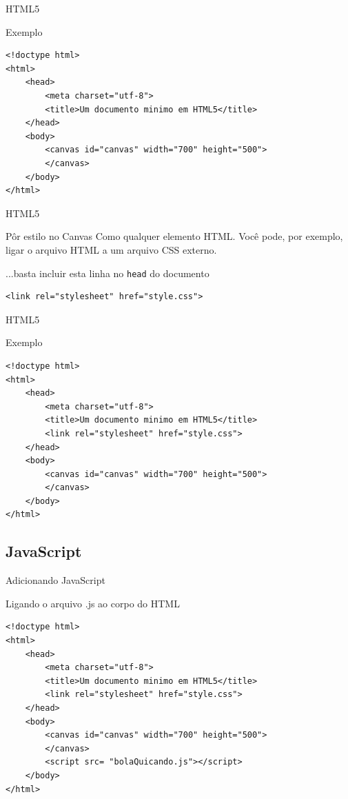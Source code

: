 \documentclass[xcolor=dvipsnames,table]{beamer}
\begin{document}
\begin{frame}[fragile]{HTML5}
	\begin{block}{Exemplo}
		\begin{lstlisting}
<!doctype html>
<html>
	<head>
		<meta charset="utf-8">
		<title>Um documento minimo em HTML5</title>
	</head>
	<body>
		<canvas id="canvas" width="700" height="500">
		</canvas>
	</body>
</html>
\end{lstlisting}
		\end{block}
\end{frame}

\begin{frame}[fragile]{HTML5}
	\begin{block}{Pôr estilo no Canvas}
		Como qualquer elemento HTML. Você pode, por exemplo, ligar o arquivo HTML a um arquivo CSS externo.
	\end{block}
	\begin{block}{...basta incluir esta linha no {\tt head} do documento}
			\begin{lstlisting}
<link rel="stylesheet" href="style.css">
\end{lstlisting}
	\end{block}
\end{frame}

\begin{frame}[fragile]{HTML5}
	\begin{block}{Exemplo}
		\begin{lstlisting}
<!doctype html>
<html>
	<head>
		<meta charset="utf-8">
		<title>Um documento minimo em HTML5</title>
		<link rel="stylesheet" href="style.css">
	</head>
	<body>
		<canvas id="canvas" width="700" height="500">
		</canvas>
	</body>
</html>
\end{lstlisting}
		\end{block}
\end{frame}

\subsection{JavaScript}
\begin{frame}[fragile]{Adicionando JavaScript}
	\begin{block}{Ligando o arquivo .js ao corpo do HTML}
		\begin{lstlisting}
<!doctype html>
<html>
	<head>
		<meta charset="utf-8">
		<title>Um documento minimo em HTML5</title>
		<link rel="stylesheet" href="style.css">
	</head>
	<body>
		<canvas id="canvas" width="700" height="500">
		</canvas>
		<script src= "bolaQuicando.js"></script>
	</body>
</html>
\end{lstlisting}
		\end{block}
\end{frame}
\end{document}
